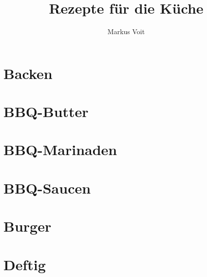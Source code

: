 \documentclass[
  DIV=11,%
  pagesize,%
  fontsize=11pt,%
  paper=a4,%
  numbers=noenddot,
]{scrartcl}
\title{Rezepte für die Küche}
\author{Markus Voit}
\begin{document}
\maketitle
\clearpage

\tableofcontents
\clearpage

\section{Backen}
\newpage
\newpage

\section{BBQ-Butter}
\newpage
\newpage
\newpage
\newpage
\newpage

\section{BBQ-Marinaden}
\newpage
\newpage
\newpage

\section{BBQ-Saucen}
\newpage
\newpage
\newpage
\newpage
\newpage
\newpage

\section{Burger}
\newpage
\newpage

\section{Deftig}
\newpage
\newpage
\newpage
\newpage
\end{document}
